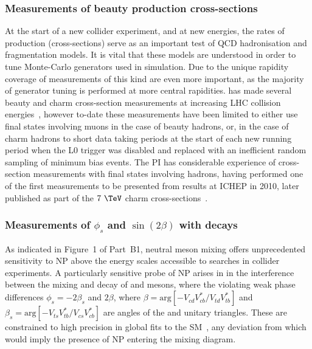 \documentclass[11pt,a4paper]{article}
\begin{document}
\subsubsection{Measurements of beauty production cross-sections}
At the start of a new collider experiment, and at new energies, the rates of production (cross-sections) serve as an important test of QCD hadronisation and fragmentation models. It is vital that these models are understood in order to tune Monte-Carlo generators used in simulation. Due to the unique rapidity coverage of \LHCb measurements of this kind are even more important, as the majority of generator tuning is performed at more central rapidities. \LHCb has made several beauty and charm cross-section measurements at increasing LHC collision energies~\cite{Aaij:2013mga,Aaij:2016jht,Aaij:2015bpa,Aaij:2017qml,Aaij:2013noa}, however to-date these measurements have been limited to either use final states involving muons in the case of beauty hadrons, or, in the case of charm hadrons to short data taking periods at the start of each new running period when the L0 trigger was disabled and replaced with an inefficient random sampling of minimum bias events. The PI has considerable experience of cross-section measurements with final states involving hadrons, having performed one of the first measurements to be presented from \LHCb results at ICHEP in 2010, later published as part of the $7~\TeV$ charm cross-sections~\cite{Aaij:2013mga}.

\subsubsection{Measurements of $\phi_s$ and $\sin(2\beta)$ with \HepProcess{\PB\to\PD\PD} decays}
As indicated in Figure~1 of Part~B1, neutral meson mixing offers unprecedented sensitivity to NP above the energy scales accessible to searches in collider experiments.  A particularly sensitive probe of NP arises in \CPv in the interference between the mixing and decay of \HepProcess{\PBs-\APBs} and \HepProcess{\PBzero-\APBzero} mesons, where the \CP violating weak phase differences $\phi_s=-2\beta_s$ and $2\beta$, where $ \beta = \mathrm{arg}[-V_{cd}V_{cb}^{*}/V_{td}V_{tb}^{*}]$ and $\beta_s =  \mathrm{arg} [-V_{ts}V_{tb}^{*}/V_{cs}V_{cb}^{*}]$ are angles of the \HepProcess{\Pqb-\Pqd} and \HepProcess{\Pqb-\Pqs} unitary triangles. These are constrained to high precision in global fits to the SM~\cite{Koppenburg:2017mad}, any deviation from which would imply the presence of NP entering the mixing diagram. 
\end{document}
